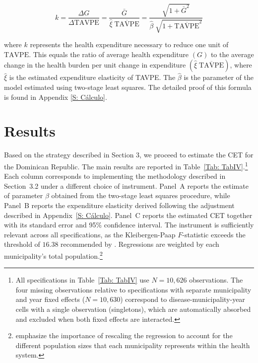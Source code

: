 \documentclass[11pt]{article}
\numberwithin{equation}{section}
\theoremstyle{remark}
\begin{document}
\[k=\dfrac{\Delta G}{\Delta \text{TAVPE}}=\dfrac{\bar{G}}{\hat{\xi} \;\overline{\text{TAVPE}}}=\dfrac{\sqrt{1+\bar{G}^2}}{\hat{\beta} \; \sqrt{1+\overline{\text{TAVPE}}^2}  }\]

where \(k\) represents the health expenditure necessary to reduce one unit of \(\text{TAVPE}\). This equals the ratio of average health expenditure \((G)\) to the average change in the health burden per unit change in expenditure \((\hat{\xi}\; \overline{\text{TAVPE}})\), where \(\hat{\xi}\) is the estimated expenditure elasticity of TAVPE. The \(\hat{\beta}\) is the parameter of the model estimated using two-stage least squares. The detailed proof of this formula is found in Appendix \ref{S: Cálculo}.

\section{Results}

Based on the strategy described in Section 3, we proceed to estimate the CET for the Dominican Republic. The main results are reported in Table~\ref{Tab: TabIV}.\footnote{All specifications in Table~\ref{Tab: TabIV} use $N = 10{,}626$ observations. The four missing observations relative to specifications with separate municipality and year fixed effects ($N = 10{,}630$) correspond to disease-municipality-year cells with a single observation (singletons), which are automatically absorbed and excluded when both fixed effects are interacted.} Each column corresponds to implementing the methodology described in Section~3.2 under a different choice of instrument. Panel~A reports the estimate of parameter $\beta$ obtained from the two-stage least squares procedure, while Panel~B reports the expenditure elasticity derived following the adjustment described in Appendix~\ref{S: Cálculo}. Panel~C reports the estimated CET together with its standard error and 95\% confidence interval. The instrument is sufficiently relevant across all specifications, as the Kleibergen-Paap $F$-statistic exceeds the threshold of $16.38$ recommended by \citet{StockYogo2005}. Regressions are weighted by each municipality's total population.\footnote{\citet[p.200]{Claxton2015} emphasize the importance of rescaling the regression to account for the different population sizes that each municipality represents within the health system.}\\
\end{document}
